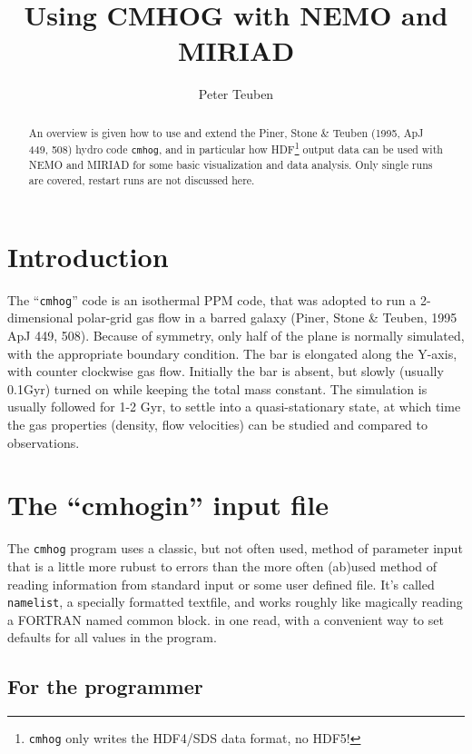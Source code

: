 \documentclass[10pt,dvips]{article}
\title{Using CMHOG with NEMO and MIRIAD}
\author{Peter Teuben}
\begin{document}
\maketitle


\begin{abstract}

An overview is given how to use and extend 
the Piner, Stone \& Teuben (1995, ApJ 449, 508) hydro code
{\tt cmhog}, and in particular how 
HDF\footnote{{\tt cmhog} only writes the HDF4/SDS data format, no HDF5!}
output data can be used with
NEMO and MIRIAD for some basic visualization and data analysis.
Only single runs are covered, restart runs are not discussed here.

\end{abstract}

\section{Introduction}

The ``{\tt cmhog}'' code is an isothermal PPM code, 
that was adopted to run a 2-dimensional polar-grid gas flow in a 
barred galaxy (Piner, Stone \& Teuben, 1995 ApJ 449, 508).
Because of symmetry, only half of the plane is normally
simulated, with the appropriate  boundary condition.
The bar is elongated along the Y-axis, with 
counter clockwise gas flow. Initially the bar is absent, but
slowly (usually 0.1Gyr) turned on while keeping
the total mass constant. The simulation
is usually followed for 1-2 Gyr, to settle into a quasi-stationary
state, at which time the gas properties (density, flow velocities)
can be studied and compared to observations.

\section{The ``cmhogin'' input file}

The {\tt cmhog} program uses a classic, but not often used, method of parameter input
that is a little more rubust to errors than the more often (ab)used method
of reading information from standard input or some user defined file.
It's called {\tt namelist},
a specially formatted textfile, 
and works roughly like magically reading a FORTRAN named common block.
in one read, with a convenient way to set defaults for all values
in the program.

\subsection{For the programmer}
\end{document}

